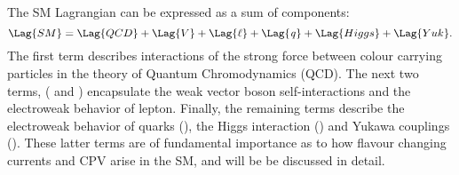 The SM Lagrangian can be expressed as a sum of components:
\begin{equation}
  \Lag{SM} = \Lag{QCD} + \Lag{V} + \Lag{\ell} + \Lag{\it q} + \Lag{Higgs} + \Lag{Yuk}.
  \label{eq:th:lag}
\end{equation}
The first term describes interactions of the strong force between colour carrying particles in the
theory of Quantum Chromodynamics (QCD).
The next two terms, ( and \Lag{\ell}) encapsulate the weak vector boson self-interactions
and the electroweak behavior of lepton.
Finally, the remaining terms describe the electroweak behavior of quarks (), the Higgs
interaction () and
Yukawa couplings ().
These latter terms are of fundamental importance as to how flavour changing currents and CPV
arise in the SM, and will be be discussed in detail.

%

